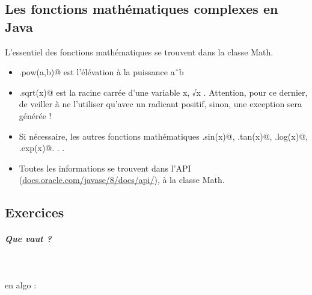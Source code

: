 \documentclass[11pt,a4paper]{article}
\begin{document}
            \par
        \subsection{Les fonctions math\'ematiques complexes en Java}
        L'essentiel des fonctions math\'ematiques se trouvent dans la classe Math.
          
					\begin{itemize}
				
			\item \verb@Math.pow(a,b)@ est l'\'el\'evation \`a la puissance aˆb
			\item \verb@Math.sqrt(x)@ est la racine carr\'ee d'une variable x, √x . Attention, pour ce dernier, de veiller \`a ne l'utiliser qu'avec un radicant positif, sinon, une exception sera g\'en\'er\'ee !
			\item Si n\'ecessaire, les autres fonctions math\'ematiques \verb@Math.sin(x)@, 
            \verb@Math.tan(x)@, \verb@Math.log(x)@, \verb@Math.exp(x)@. . .
			\item Toutes les informations se trouvent dans l'API (\url{docs.oracle.com/javase/8/docs/api/}), \`a la classe Math.
					\end{itemize}
				
            \par
        \subsection{Exercices}
			
		\subparagraph{Que vaut ?} 
		
                \textcolor{white}{.} \par
            
							  en algo :
							
\end{document}
